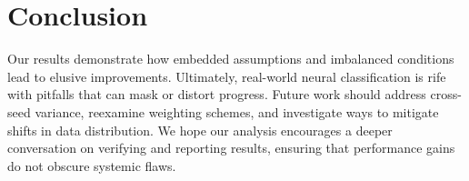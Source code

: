 \documentclass[11pt]{article}
\begin{document}
\section{Conclusion}
Our results demonstrate how embedded assumptions and imbalanced conditions lead to elusive improvements. Ultimately, real-world neural classification is rife with pitfalls that can mask or distort progress. Future work should address cross-seed variance, reexamine weighting schemes, and investigate ways to mitigate shifts in data distribution. We hope our analysis encourages a deeper conversation on verifying and reporting results, ensuring that performance gains do not obscure systemic flaws.


\end{document}
